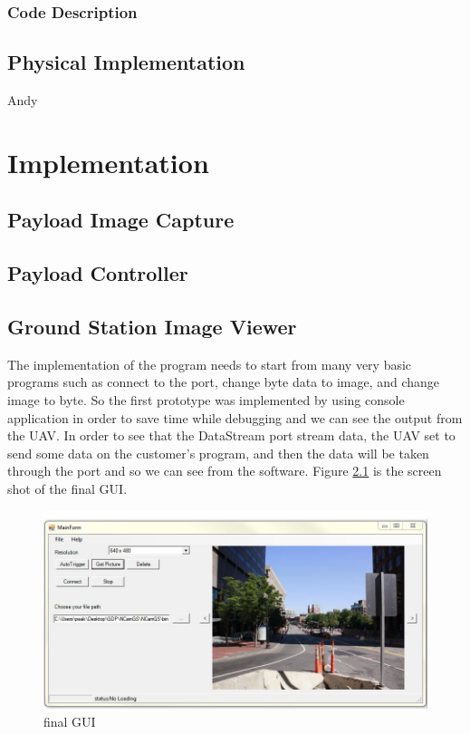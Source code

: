 \documentclass[oneside]{ecsgdp}         %
\begin{document}
\subsection{Code Description}

\section{Physical Implementation}
Andy

\chapter{Implementation}


\section{Payload Image Capture}

\section{Payload Controller}

\section{Ground Station Image Viewer}
The implementation of the program needs to start from many very basic programs such as connect to the port, change byte data to image, and change image to byte. So the first prototype was implemented by using console application in order to save time while debugging and we can see the output from the UAV. In order to see that the DataStream port stream data, the UAV set to send some data on the customer’s program, and then the data will be taken through the port and so we can see from the software. Figure \ref{finalGUI} is the screen shot of the final GUI. 

\begin{center}
\begin{figure}[!hbtp]
\includegraphics[scale=0.5]{finalGUI.png} 
\caption{final GUI\label{finalGUI}}
\end{figure}
\end{center}
 
\end{document}

